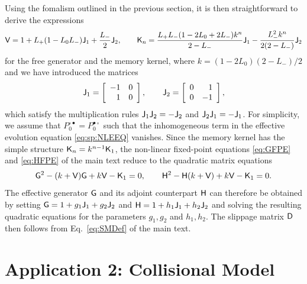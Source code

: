 \documentclass[aps,prl,reprint]{revtex4-2}
\begin{document}
Using the fomalism outlined in the previous section, it is then straightforward to derive the expressions
\begin{equation}
\mathsf{V} = 1+ L_+(1-L_0L_-)\mathsf{J}_1 + \frac{L_-}{2}\mathsf{J}_2, \qquad
\mathsf{K}_n = \frac{L_+L_-(1-2L_0+2L_-)k^n}{2-L_-}\mathsf{J}_1
- \frac{L_-^2k^n}{2(2-L_-)}\mathsf{J}_2
\end{equation}
for the free generator and the memory kernel, where $k=(1-2L_0)(2-L_-)/2$ and we have introduced the matrices
\begin{equation}
\mathsf{J}_1 = \left[\begin{array}{rr}
-1 & 0 \\ 1 & 0
\end{array}
\right], \qquad
\mathsf{J}_2 = \left[\begin{array}{rr}
0 & 1 \\ 0 & -1
\end{array}
\right],
\end{equation}
which satisfy the multiplication rules $\mathsf{J}_1\mathsf{J}_2= -\mathsf{J}_2$ and $\mathsf{J}_2\mathsf{J}_1= -\mathsf{J}_1$.
For simplicity, we assume that $P^{\circ\bullet}_0 = P^{\bullet\circ}_0$ such that the inhomogeneous term in the effective evolution equation \eqref{eq:sp:NLEEQ} vanishes.
Since the memory kernel has the simple structure $\mathsf{K}_n = k^{n-1}\mathsf{K}_1$, the non-linear fixed-point equations \eqref{eq:GFPE} and \eqref{eq:HFPE} of the main text reduce to the quadratic matrix equations
\begin{equation}
\mathsf{G}^2 -(k+\mathsf{V})\mathsf{G} + k\mathsf{V} - \mathsf{K}_1 = 0, \qquad
\mathsf{H}^2 -\mathsf{H}(k+\mathsf{V}) + k\mathsf{V} - \mathsf{K}_1 = 0.
\end{equation}
The effective generator $\mathsf{G}$ and its adjoint counterpart $\mathsf{H}$ can therefore be obtained by setting $\mathsf{G} = 1 + g_1 \mathsf{J}_1 + g_2 \mathsf{J}_2$ and $\mathsf{H} = 1 + h_1 \mathsf{J}_1 + h_2 \mathsf{J}_2$ and solving the resulting quadratic equations for the parameters $g_1, g_2$ and $h_1, h_2$.
The slippage matrix $\mathsf{D}$ then follows from Eq.~\eqref{eq:SMDef} of the main text.


\section{Application 2: Collisional Model}
\end{document}

